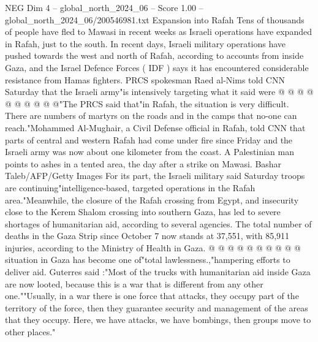 \begin{textsample}{NEG Dim 4 – global\_north\_2024\_06 – Score 1.00 – global\_north\_2024\_06/200546981.txt}
Expansion into Rafah Tens of thousands of people have fled to Mawasi in recent weeks as Israeli operations have expanded in Rafah, just to the south.
In recent days, Israeli military operations have pushed towards the west and north of Rafah, according to accounts from inside Gaza, and the Israel Defence Forces ( IDF ) says it has encountered considerable resistance from Hamas fighters.
PRCS spokesman Raed al-Nims told CNN Saturday that the Israeli army"is intensively targeting what it said were @ @ @ @ @ @ @ @ @ @"The PRCS said that"in Rafah, the situation is very difficult.
There are numbers of martyrs on the roads and in the camps that no-one can reach."Mohammed Al-Mughair, a Civil Defense official in Rafah, told CNN that parts of central and western Rafah had come under fire since Friday and the Israeli army was now about one kilometer from the coast.
A Palestinian man points to ashes in a tented area, the day after a strike on Mawasi.
Bashar Taleb/AFP/Getty Images For its part, the Israeli military said Saturday troops are continuing"intelligence-based, targeted operations in the Rafah area."Meanwhile, the closure of the Rafah crossing from Egypt, and insecurity close to the Kerem Shalom crossing into southern Gaza, has led to severe shortages of humanitarian aid, according to several agencies.
The total number of deaths in the Gaza Strip since October 7 now stands at 37,551, with 85,911 injuries, according to the Ministry of Health in Gaza. @ @ @ @ @ @ @ @ @ @ situation in Gaza has become one of"total lawlessness.,"hampering efforts to deliver aid.
Guterres said :"Most of the trucks with humanitarian aid inside Gaza are now looted, because this is a war that is different from any other one.""Usually, in a war there is one force that attacks, they occupy part of the territory of the force, then they guarantee security and management of the areas that they occupy.
Here, we have attacks, we have bombings, then groups move to other places."

\end{textsample}
